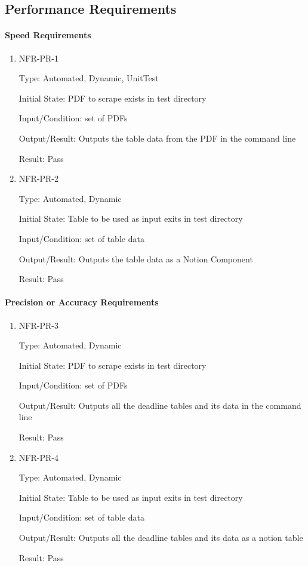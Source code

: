 \documentclass[12pt, titlepage]{article}
\begin{document}
\subsection{Performance Requirements}
		
\paragraph{Speed Requirements}

\begin{enumerate}

\item{NFR-PR-1\\}

Type: Automated, Dynamic, UnitTest 

Initial State: PDF to scrape exists in test directory 

Input/Condition: set of PDFs 

Output/Result: Outputs the table data from the PDF in the command line 

Result: Pass

\item{NFR-PR-2\\}

Type: Automated, Dynamic 

Initial State: Table to be used as input exits in test directory 

Input/Condition: set of table data 

Output/Result: Outputs the table data as a Notion Component 

Result: Pass

\end{enumerate}

\paragraph{Precision or Accuracy Requirements}

\begin{enumerate}

\item{NFR-PR-3\\}

Type: Automated, Dynamic 

Initial State: PDF to scrape exists in test directory 

Input/Condition: set of PDFs 

Output/Result: Outputs all the deadline tables and its data in the command line 

Result: Pass

\item{NFR-PR-4\\}

Type: Automated, Dynamic 

Initial State: Table to be used as input exits in test directory 

Input/Condition: set of table data 

Output/Result: Outputs all the deadline tables and its data as a notion table  

Result: Pass

\end{enumerate}
\end{document}
